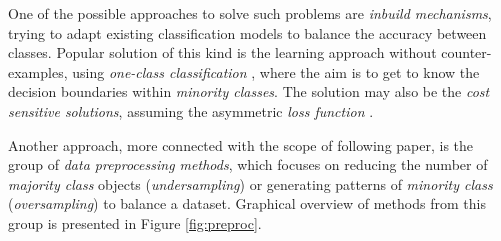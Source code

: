 \documentclass[pmlr]{jmlr}
\begin{document}
One of the possible approaches to solve such problems are \emph{inbuild mechanisms}, trying to adapt existing classification models to balance the accuracy between classes. Popular solution of this kind is the learning approach without counter-examples, using \emph{one-class classification} \citep{Japkowicz:1995, Krawczyk:2014ins}, where the aim is to get to know the decision boundaries within \emph{minority classes}. The solution may also be the \emph{cost sensitive solutions}, assuming the asymmetric \emph{loss function} \citep{Lopez:2012,He:2009}.

Another approach, more connected with the scope of following paper, is the group of \emph{data preprocessing methods}, which focuses on reducing the number of \emph{majority class} objects (\emph{undersampling}) or generating patterns of \emph{minority class} (\emph{oversampling}) to balance a dataset. Graphical overview of methods from this group is presented in Figure \ref{fig:preproc}. 
\end{document}
